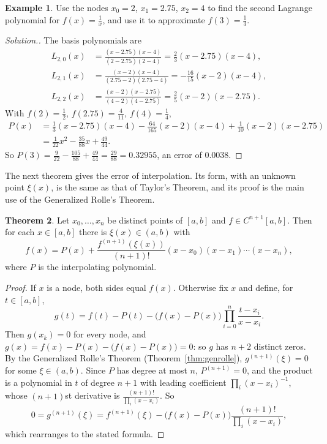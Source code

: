 \documentclass[11pt,a4paper]{article}
\numberwithin{equation}{section}
\theoremstyle{definition}
\newtheorem{thm}{Theorem}[subsection]
\newtheorem{exa}[thm]{Example}
\newenvironment{solution}
  {\renewcommand{\qedsymbol}{}\begin{proof}[\textit{Solution}.]}
  {\end{proof}}
\begin{document}
\begin{exa}
\label{exa:lagrange}
Use the nodes $x_0 = 2$, $x_1 = 2.75$, $x_2 = 4$ to find the second Lagrange polynomial for $f(x) = \frac1x$, and use it to approximate
$f(3) = \frac13$.
\end{exa}

\begin{solution}
The basis polynomials are
\begin{align*}
L_{2,0}(x) &= \frac{(x-2.75)(x-4)}{(2-2.75)(2-4)} = \frac23(x-2.75)(x-4),\\
L_{2,1}(x) &= \frac{(x-2)(x-4)}{(2.75-2)(2.75-4)} = -\frac{16}{15}(x-2)(x-4),\\
L_{2,2}(x) &= \frac{(x-2)(x-2.75)}{(4-2)(4-2.75)} = \frac25(x-2)(x-2.75).
\end{align*}
With $f(2) = \frac12$, $f(2.75) = \frac4{11}$, $f(4) = \frac14$,
\begin{align*}
P(x) &= \frac13(x-2.75)(x-4)-\frac{64}{165}(x-2)(x-4)+\frac1{10}(x-2)(x-2.75)\\
&= \frac{1}{22}x^2-\frac{35}{88}x+\frac{49}{44} .
\end{align*}
So $P(3) = \frac{9}{22}-\frac{105}{88}+\frac{49}{44} = \frac{29}{88} = 0.32955$, an error of $0.0038$.
\end{solution}

The next theorem gives the error of interpolation. Its form, with an unknown point $\xi(x)$, is the same as that of Taylor's Theorem, and
its proof is the main use of the Generalized Rolle's Theorem.

\begin{thm}
\label{thm:interperr}
Let $x_0,\dots,x_n$ be distinct points of $[a,b]$ and $f\in C^{n+1}[a,b]$. Then for each $x\in[a,b]$ there is $\xi(x)\in(a,b)$ with
$$f(x) = P(x)+\frac{f^{(n+1)}(\xi(x))}{(n+1)!}(x-x_0)(x-x_1)\cdots(x-x_n),$$
where $P$ is the interpolating polynomial.
\end{thm}

\begin{proof}
If $x$ is a node, both sides equal $f(x)$. Otherwise fix $x$ and define, for $t\in[a,b]$,
$$g(t) = f(t)-P(t)-\bigl(f(x)-P(x)\bigr)\prod_{i=0}^n\frac{t-x_i}{x-x_i} .$$
Then $g(x_k) = 0$ for every node, and $g(x) = f(x)-P(x)-\bigl(f(x)-P(x)\bigr) = 0$: so $g$ has $n+2$ distinct zeros. By the Generalized
Rolle's Theorem (Theorem~\ref{thm:genrolle}), $g^{(n+1)}(\xi) = 0$ for some $\xi\in(a,b)$. Since $P$ has degree at most $n$, $P^{(n+1)} = 0$,
and the product is a polynomial in $t$ of degree $n+1$ with leading coefficient $\prod_i(x-x_i)^{-1}$, whose $(n+1)$st derivative is
$\frac{(n+1)!}{\prod_i(x-x_i)}$. So
$$0 = g^{(n+1)}(\xi) = f^{(n+1)}(\xi)-\bigl(f(x)-P(x)\bigr)\frac{(n+1)!}{\prod_i(x-x_i)},$$
which rearranges to the stated formula.
\end{proof}
\end{document}
